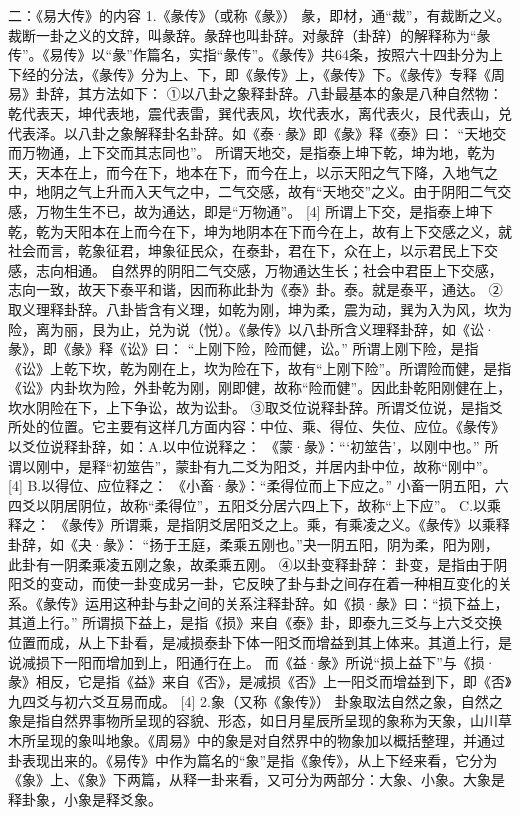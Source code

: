 \documentclass[12pt,UTF8]{ctexbook}
\begin{document}
二：《易大传》的内容
1.《彖传》（或称《彖》）
彖，即材，通“裁”，有裁断之义。裁断一卦之义的文辞，叫彖辞。彖辞也叫卦辞。对彖辞（卦辞）的解释称为“彖传”。《易传》以“彖”作篇名，实指“彖传”。《彖传》共64条，按照六十四卦分为上下经的分法，《彖传》分为上、下，即《彖传》上，《彖传》下。《彖传》专释《周易》卦辞，其方法如下：
①以八卦之象释卦辞。八卦最基本的象是八种自然物：乾代表天，坤代表地，震代表雷，巽代表风，坎代表水，离代表火，艮代表山，兑代表泽。以八卦之象解释卦名卦辞。如《泰·彖》即《彖》释《泰》曰：
“天地交而万物通，上下交而其志同也”。
所谓天地交，是指泰上坤下乾，坤为地，乾为天，天本在上，而今在下，地本在下，而今在上，以示天阳之气下降，入地气之中，地阴之气上升而入天气之中，二气交感，故有“天地交”之义。由于阴阳二气交感，万物生生不已，故为通达，即是“万物通”。 [4]
所谓上下交，是指泰上坤下乾，乾为天阳本在上而今在下，坤为地阴本在下而今在上，故有上下交感之义，就社会而言，乾象征君，坤象征民众，在泰卦，君在下，众在上，以示君民上下交感，志向相通。
自然界的阴阳二气交感，万物通达生长；社会中君臣上下交感，志向一致，故天下泰平和谐，因而称此卦为《泰》卦。泰。就是泰平，通达。
②取义理释卦辞。八卦皆含有义理，如乾为刚，坤为柔，震为动，巽为入为风，坎为险，离为丽，艮为止，兑为说（悦）。《彖传》以八卦所含义理释卦辞，如《讼·彖》，即《彖》释《讼》曰：
“上刚下险，险而健，讼。”
所谓上刚下险，是指《讼》上乾下坎，乾为刚在上，坎为险在下，故有“上刚下险”。所谓险而健，是指《讼》内卦坎为险，外卦乾为刚，刚即健，故称“险而健”。因此卦乾阳刚健在上，坎水阴险在下，上下争讼，故为讼卦。
③取爻位说释卦辞。所谓爻位说，是指爻所处的位置。它主要有这样几方面内容：中位、乘、得位、失位、应位。《彖传》以爻位说释卦辞，如：A.以中位说释之：
《蒙·彖》：“‘初筮告’，以刚中也。”
所谓以刚中，是释“初筮告”，蒙卦有九二爻为阳爻，并居内卦中位，故称“刚中”。 [4]
B.以得位、应位释之：
《小畜·彖》：“柔得位而上下应之。”
小畜一阴五阳，六四爻以阴居阴位，故称“柔得位”，五阳爻分居六四上下，故称“上下应”。
C.以乘释之：
《彖传》所谓乘，是指阴爻居阳爻之上。乘，有乘凌之义。《彖传》以乘释卦辞，如《夬·彖》：
“扬于王庭，柔乘五刚也。”夬一阴五阳，阴为柔，阳为刚，此卦有一阴柔乘凌五刚之象，故柔乘五刚。
④以卦变释卦辞：
卦变，是指由于阴阳爻的变动，而使一卦变成另一卦，它反映了卦与卦之间存在着一种相互变化的关系。《彖传》运用这种卦与卦之间的关系注释卦辞。如《损·彖》曰：“损下益上，其道上行。”
所谓损下益上，是指《损》来自《泰》卦，即泰九三爻与上六爻交换位置而成，从上下卦看，是减损泰卦下体一阳爻而增益到其上体来。其道上行，是说减损下一阳而增加到上，阳通行在上。
而《益·彖》所说“损上益下”与《损·彖》相反，它是指《益》来自《否》，是减损《否》上一阳爻而增益到下，即《否》九四爻与初六爻互易而成。 [4]
2.象（又称《象传》）
卦象取法自然之象，自然之象是指自然界事物所呈现的容貌、形态，如日月星辰所呈现的象称为天象，山川草木所呈现的象叫地象。《周易》中的象是对自然界中的物象加以概括整理，并通过卦表现出来的。《易传》中作为篇名的“象”是指《象传》，从上下经来看，它分为《象》上、《象》下两篇，从释一卦来看，又可分为两部分：大象、小象。大象是释卦象，小象是释爻象。
\end{document}
